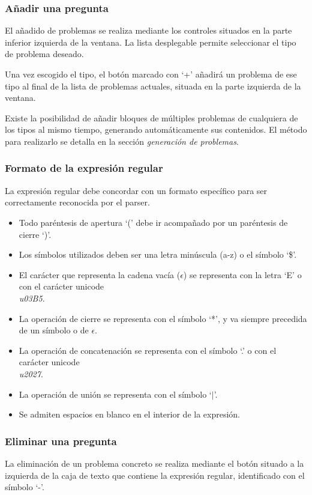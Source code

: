 \subsubsection{Añadir una pregunta}
El añadido de problemas se realiza mediante los controles situados en la parte inferior izquierda de la ventana.
La lista desplegable permite seleccionar el tipo de problema deseado.

Una vez escogido el tipo, el botón marcado con `+' añadirá un problema de ese tipo al final de la lista de problemas actuales, situada en la parte izquierda de la ventana.


Existe la posibilidad de añadir bloques de múltiples problemas de cualquiera de los tipos al mismo tiempo, generando automáticamente sus contenidos.
El método para realizarlo se detalla en la sección \emph{generación de problemas}.

\subsubsection{Formato de la expresión regular}
La expresión regular debe concordar con un formato específico para ser correctamente reconocida por el parser.
\begin{itemize}
	\item Todo paréntesis de apertura `(' debe ir acompañado por un paréntesis de cierre `)'.
	\item Los símbolos utilizados deben ser una letra minúscula (a-z) o el símbolo `\$'.
	\item El carácter que representa la cadena vacía ($ \epsilon $) se representa con la letra `E' o con el carácter unicode \emph{\\u03B5}.
	\item La operación de cierre se representa con el símbolo `*', y va siempre precedida de un símbolo o de $ \epsilon $.
	\item La operación de concatenación se representa con el símbolo `.' o con el carácter unicode \emph{\\u2027}.
	\item La operación de unión se representa con el símbolo `$ | $'.
	\item Se admiten espacios en blanco en el interior de la expresión.
\end{itemize}

\subsubsection{Eliminar una pregunta}
La eliminación de un problema concreto se realiza mediante el botón situado a la izquierda de la caja de texto que contiene la expresión regular, identificado con el símbolo `-'.

